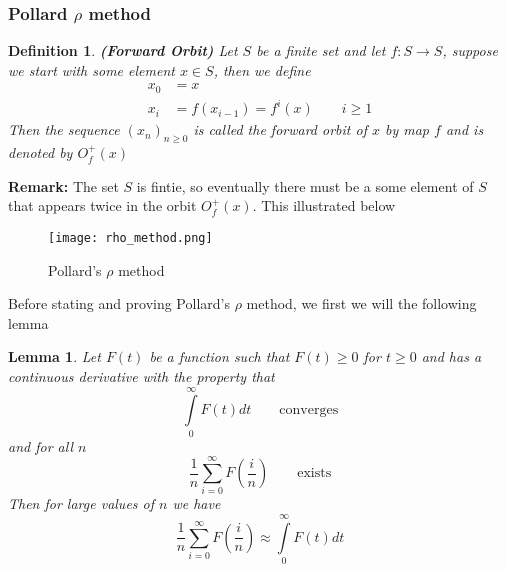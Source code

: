 \documentclass[a4 paper]{article}
\newcommand{\?}{\stackrel{?}{=}}
\newtheorem{lemma}[theorem]{Lemma}
\newtheorem{definition}{Definition}[section]
\begin{document}
\subsubsection{Pollard \texorpdfstring{$ \rho $}{TEXT} method}
\begin{Definition}
\begin{definition}
\textbf{(Forward Orbit)} Let $ S $ be a finite set and let $ f : S \to S $, suppose we start with some element $ x \in S $, then we define 
\begin{align*}
    x_0 &= x  \\ 
    x_i & = f(x_{i-1}) = f^i (x)  \qquad i \geq 1 
\end{align*}
Then the sequence $ (x_n)_{n\geq 0} $ is called the forward orbit of $ x $ by map $ f $ and is denoted by $ O^+_f(x) $
\end{definition}
\end{Definition}

\begin{note}{\bcicosaedre}
\textbf{Remark:} The set $ S $ is fintie, so eventually there must be a some element of $ S $ that appears twice in the orbit $ O_f^+ (x) $. This illustrated below 
\begin{figure}[H]
    \centering
    \texttt{[image: rho\_method.png]}
    \caption{Pollard's $ \rho $ method \cite[p.235]{hoffstein2008introduction}\label{rho_method}}
\end{figure}
\end{note}

Before stating and proving Pollard's $ \rho $ method, we first we will the following lemma 
\begin{tcolorbox}[breakable]
\begin{lemma}
Let $ F(t) $ be a function such that $ F(t) \geq 0 $ for $ t\geq 0 $ and has a continuous derivative with the property that
$$ \int\limits_{0}^{\infty} F(t)dt \qquad \text{converges} $$ 
and for all $ n $
$$ \frac{1}{n } \sum\limits_{i  =0}^{\infty} F\left(\frac{i}{n}\right) \qquad \text{exists} $$
Then for large values of $ n$ we have 
$$ \frac{1}{n}\sum\limits_{i =0 }^{\infty} F \left(\frac{i}{n}\right) \approx  \int\limits_{0}^{\infty} F(t)dt  $$


\end{lemma}
\end{tcolorbox}
\end{document}
